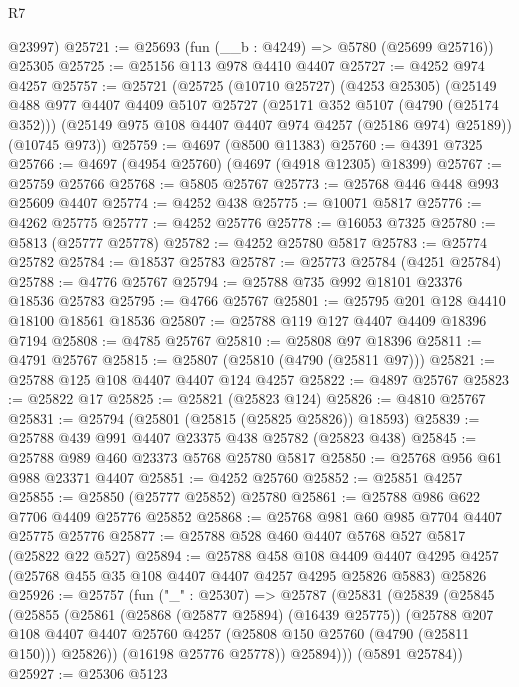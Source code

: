 \begin{lexlean}{R7}
\begin{coremodule}
      @23997)
@25721 := @25693 (fun (__b : @4249) => @5780 (@25699 @25716)) @25305
@25725 := @25156 @113 @978 @4410 @4407
@25727 := @4252 @974 @4257
@25757 := @25721
    (@25725
      (@10710 @25727)
      (@4253 @25305)
      (@25149
        @488
        @977
        @4407
        @4409
        @5107
        @25727
        (@25171 @352 @5107 (@4790 (@25174 @352)))
        (@25149 @975 @108 @4407 @4407 @974 @4257 (@25186 @974) @25189))
      (@10745 @973))
@25759 := @4697 (@8500 @11383)
@25760 := @4391 @7325
@25766 := @4697 (@4954 @25760) (@4697 (@4918 @12305) @18399)
@25767 := @25759 @25766
@25768 := @5805 @25767
@25773 := @25768 @446 @448 @993 @25609 @4407
@25774 := @4252 @438
@25775 := @10071 @5817
@25776 := @4262 @25775
@25777 := @4252 @25776
@25778 := @16053 @7325
@25780 := @5813 (@25777 @25778)
@25782 := @4252 @25780 @5817
@25783 := @25774 @25782
@25784 := @18537 @25783
@25787 := @25773 @25784 (@4251 @25784)
@25788 := @4776 @25767
@25794 := @25788 @735 @992 @18101 @23376 @18536 @25783
@25795 := @4766 @25767
@25801 := @25795 @201 @128 @4410 @18100 @18561 @18536
@25807 := @25788 @119 @127 @4407 @4409 @18396 @7194
@25808 := @4785 @25767
@25810 := @25808 @97 @18396
@25811 := @4791 @25767
@25815 := @25807 (@25810 (@4790 (@25811 @97)))
@25821 := @25788 @125 @108 @4407 @4407 @124 @4257
@25822 := @4897 @25767
@25823 := @25822 @17
@25825 := @25821 (@25823 @124)
@25826 := @4810 @25767
@25831 := @25794 (@25801 (@25815 (@25825 @25826)) @18593)
@25839 := @25788 @439 @991 @4407 @23375 @438 @25782 (@25823 @438)
@25845 := @25788 @989 @460 @23373 @5768 @25780 @5817
@25850 := @25768 @956 @61 @988 @23371 @4407
@25851 := @4252 @25760
@25852 := @25851 @4257
@25855 := @25850 (@25777 @25852) @25780
@25861 := @25788 @986 @622 @7706 @4409 @25776 @25852
@25868 := @25768 @981 @60 @985 @7704 @4407 @25775 @25776
@25877 := @25788 @528 @460 @4407 @5768 @527 @5817 (@25822 @22 @527)
@25894 := @25788
    @458
    @108
    @4409
    @4407
    @4295
    @4257
    (@25768 @455 @35 @108 @4407 @4407 @4257 @4295 @25826 @5883)
    @25826
@25926 := @25757
    (fun ("_" : @25307) =>
    @25787
      (@25831
        (@25839
          (@25845
            (@25855
              (@25861
                (@25868 (@25877 @25894) (@16439 @25775))
                (@25788
                  @207
                  @108
                  @4407
                  @4407
                  @25760
                  @4257
                  (@25808 @150 @25760 (@4790 (@25811 @150)))
                  @25826))
              (@16198 @25776 @25778))
            @25894)))
      (@5891 @25784))
@25927 := @25306 @5123

\end{coremodule}
\end{lexlean}
